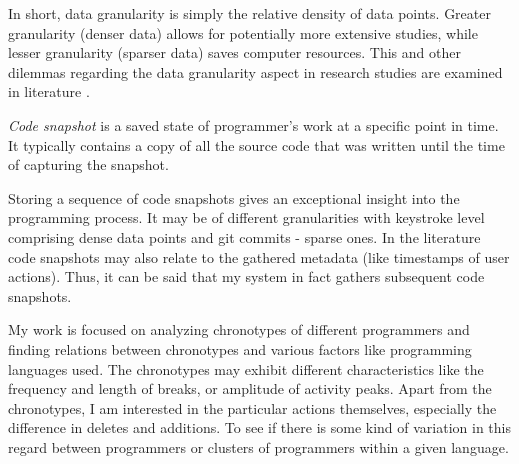 In short, data granularity is simply the relative density of data points. Greater granularity (denser data) allows for potentially more extensive studies, while lesser granularity (sparser data) saves computer resources. This and other dilemmas regarding the data granularity aspect in research studies are examined in literature \cite{Vih14CodeSnapshotGranularity}.

\begin{definition}
\emph{Code snapshot} is a saved state of programmer's work at a specific point in time. It typically contains a copy of all the source code that was written until the time of capturing the snapshot. \cite{Jad06NoviceCompilationBehaviour}
\end{definition}

Storing a sequence of code snapshots gives an exceptional insight into the programming process. It may be of different granularities with keystroke level comprising dense data points and git commits - sparse ones. In the literature code snapshots may also relate to the gathered metadata (like timestamps of user actions). Thus, it can be said that my system in fact gathers subsequent code snapshots.

My work is focused on analyzing chronotypes of different programmers and finding relations between chronotypes and various factors like programming languages used. The chronotypes may exhibit different characteristics like the frequency and length of breaks, or amplitude of activity peaks. Apart from the chronotypes, I am interested in the particular actions themselves, especially the difference in deletes and additions. To see if there is some kind of variation in this regard between programmers or clusters of programmers within a given language.
